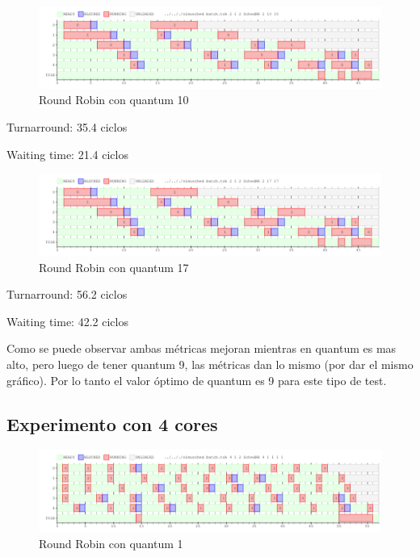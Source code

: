 \begin{figure}[H]
\begin{center}
\includegraphics[width=1.1\textwidth]{img/core2q10.png}
     \caption{Round Robin con quantum 10}
\end{center}
\end{figure}

Turnarround: 35.4 ciclos

Waiting time: 21.4 ciclos 

\begin{figure}[H]
\begin{center}
\includegraphics[width=1.1\textwidth]{img/core2q17.png}
     \caption{Round Robin con quantum 17}
\end{center}
\end{figure}

Turnarround: 56.2 ciclos

Waiting time: 42.2 ciclos

Como se puede observar ambas métricas mejoran mientras en quantum es mas alto, pero luego de tener quantum 9, las métricas dan lo mismo (por dar el mismo gráfico). Por lo tanto el valor óptimo de quantum es 9 para este tipo de test.

\subsection{Experimento con 4 cores}

\begin{figure}[H]
\begin{center}
\includegraphics[width=1.1\textwidth]{img/core4q1.png}
     \caption{Round Robin con quantum 1}
\end{center}
\end{figure}

